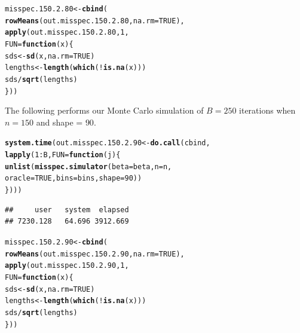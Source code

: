 \documentclass[11pt]{article}\usepackage[]{graphicx}\usepackage[]{color}
\makeatletter
\newcommand{\hlnum}[1]{\textcolor[rgb]{0.686,0.059,0.569}{#1}}%
\newcommand{\hlopt}[1]{\textcolor[rgb]{0,0,0}{#1}}%
\newcommand{\hlstd}[1]{\textcolor[rgb]{0.345,0.345,0.345}{#1}}%
\newcommand{\hlkwa}[1]{\textcolor[rgb]{0.161,0.373,0.58}{\textbf{#1}}}%
\newcommand{\hlkwb}[1]{\textcolor[rgb]{0.69,0.353,0.396}{#1}}%
\newcommand{\hlkwc}[1]{\textcolor[rgb]{0.333,0.667,0.333}{#1}}%
\newcommand{\hlkwd}[1]{\textcolor[rgb]{0.737,0.353,0.396}{\textbf{#1}}}%
\newenvironment{kframe}{%
 \def\at@end@of@kframe{}%
 \ifinner\ifhmode%
  \def\at@end@of@kframe{\end{minipage}}%
  \begin{minipage}{\columnwidth}%
 \fi\fi%
 \def\FrameCommand##1{\hskip\@totalleftmargin \hskip-\fboxsep
 \colorbox{shadecolor}{##1}\hskip-\fboxsep
     \hskip-\linewidth \hskip-\@totalleftmargin \hskip\columnwidth}%
 \MakeFramed {\advance\hsize-\width
   \@totalleftmargin\z@ \linewidth\hsize
   \@setminipage}}%
 {\par\unskip\endMakeFramed%
 \at@end@of@kframe}
\newenvironment{knitrout}{}{} %
\makeatother
\begin{document}
\begin{knitrout}
\color{fgcolor}\begin{kframe}
\begin{alltt}
\hlstd{misspec.150.2.80} \hlkwb{<-} \hlkwd{cbind}\hlstd{(}
  \hlkwd{rowMeans}\hlstd{(out.misspec.150.2.80,} \hlkwc{na.rm} \hlstd{=} \hlnum{TRUE}\hlstd{),}
  \hlkwd{apply}\hlstd{(out.misspec.150.2.80,} \hlnum{1}\hlstd{,}
  \hlkwc{FUN} \hlstd{=} \hlkwa{function}\hlstd{(}\hlkwc{x}\hlstd{)\{}
    \hlstd{sds} \hlkwb{<-} \hlkwd{sd}\hlstd{(x,} \hlkwc{na.rm} \hlstd{=} \hlnum{TRUE}\hlstd{)}
    \hlstd{lengths} \hlkwb{<-} \hlkwd{length}\hlstd{(}\hlkwd{which}\hlstd{(}\hlopt{!}\hlkwd{is.na}\hlstd{(x)))}
    \hlstd{sds} \hlopt{/} \hlkwd{sqrt}\hlstd{(lengths)}
  \hlstd{\}))}
\end{alltt}
\end{kframe}
\end{knitrout}

The following performs our Monte Carlo simulation of $B = 250$ iterations 
when $n = 150$ and shape = $90$.

\begin{knitrout}
\color{fgcolor}\begin{kframe}
\begin{alltt}
\hlkwd{system.time}\hlstd{(out.misspec.150.2.90} \hlkwb{<-} \hlkwd{do.call}\hlstd{(cbind,}
  \hlkwd{lapply}\hlstd{(}\hlnum{1}\hlopt{:}\hlstd{B,} \hlkwc{FUN} \hlstd{=} \hlkwa{function}\hlstd{(}\hlkwc{j}\hlstd{)\{}
    \hlkwd{unlist}\hlstd{(}\hlkwd{misspec.simulator}\hlstd{(}\hlkwc{beta} \hlstd{= beta,} \hlkwc{n} \hlstd{= n,}
      \hlkwc{oracle} \hlstd{=} \hlnum{TRUE}\hlstd{,} \hlkwc{bins} \hlstd{= bins,} \hlkwc{shape} \hlstd{=} \hlnum{90}\hlstd{))}
\hlstd{\})))}
\end{alltt}
\begin{verbatim}
##     user   system  elapsed 
## 7230.128   64.696 3912.669
\end{verbatim}
\end{kframe}
\end{knitrout}

\begin{knitrout}
\color{fgcolor}\begin{kframe}
\begin{alltt}
\hlstd{misspec.150.2.90} \hlkwb{<-} \hlkwd{cbind}\hlstd{(}
  \hlkwd{rowMeans}\hlstd{(out.misspec.150.2.90,} \hlkwc{na.rm} \hlstd{=} \hlnum{TRUE}\hlstd{),}
  \hlkwd{apply}\hlstd{(out.misspec.150.2.90,} \hlnum{1}\hlstd{,}
  \hlkwc{FUN} \hlstd{=} \hlkwa{function}\hlstd{(}\hlkwc{x}\hlstd{)\{}
    \hlstd{sds} \hlkwb{<-} \hlkwd{sd}\hlstd{(x,} \hlkwc{na.rm} \hlstd{=} \hlnum{TRUE}\hlstd{)}
    \hlstd{lengths} \hlkwb{<-} \hlkwd{length}\hlstd{(}\hlkwd{which}\hlstd{(}\hlopt{!}\hlkwd{is.na}\hlstd{(x)))}
    \hlstd{sds} \hlopt{/} \hlkwd{sqrt}\hlstd{(lengths)}
  \hlstd{\}))}
\end{alltt}
\end{kframe}
\end{knitrout}
\end{document}
